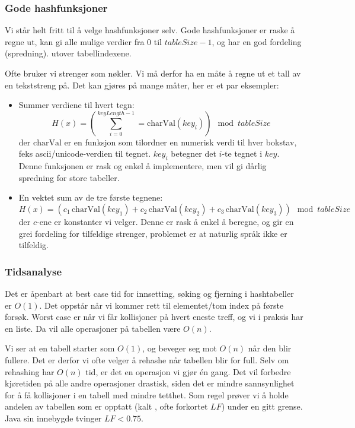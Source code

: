 \subsubsection{Gode hashfunksjoner}
Vi står helt fritt til å velge hashfunksjoner selv. Gode hashfunksjoner er raske å regne ut, kan gi alle mulige verdier fra $ 0 $ til $ tableSize - 1 $, og har en god fordeling (spredning). utover tabellindexene. 

Ofte bruker vi strenger som nøkler. Vi må derfor ha en måte å regne ut et tall av en tekststreng på. Det kan gjøres på mange måter, her er et par eksempler:
\begin{itemize}
\item Summer verdiene til hvert tegn:
\[ H(x) = \left( \sum_{i=0}^{keyLength-1} = \text{charVal}(key_i) \right) \mod{tableSize} \]
der $ \text{charVal} $ er en funksjon som tilordner en numerisk verdi til hver bokstav, feks ascii/unicode-verdien til tegnet. $ key_i $ betegner det $ i $-te tegnet i $ key $. Denne funksjonen er rask og enkel å implementere, men vil gi dårlig spredning for store tabeller. 
\item En vektet sum av de tre første tegnene:
\[ H(x) = \left( c_1\,\text{charVal}(key_1) + c_2\,\text{charVal}(key_2) + c_3\,\text{charVal}(key_3)\right)  \mod{tableSize} \]
der $ c $-ene er konstanter vi velger. Denne er rask å enkel å beregne, og gir en grei fordeling for tilfeldige strenger, problemet er at naturlig språk ikke er tilfeldig.
\end{itemize}


\subsubsection{Tidsanalyse}
Det er åpenbart at best case tid for innsetting, søking og fjerning i hashtabeller er $ O(1) $. Det oppstår når vi kommer rett til elementet/tom index på første forsøk. Worst case er når vi får kollisjoner på hvert eneste treff, og vi i praksis har en liste. Da vil alle operasjoner på tabellen være $ O(n) $. 

Vi ser at en tabell starter som $ O(1) $, og beveger seg mot $ O(n) $ når den blir fullere. Det er derfor vi ofte velger å rehashe når tabellen blir for full. Selv om rehashing har $ O(n) $ tid, er det en operasjon vi gjør én gang. Det vil forbedre kjøretiden på alle andre operasjoner drastisk, siden det er mindre sannsynlighet for å få kollisjoner i en tabell med mindre tetthet. Som regel prøver vi å holde andelen av tabellen som er opptatt (kalt , ofte forkortet $ LF $) under en gitt grense. Java sin innebygde  tvinger $ LF < 0.75 $.





